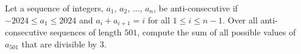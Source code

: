 Let a sequence of integers, $a_1$, $a_2$, ..., $a_n$, be anti-consecutive if $-2024 \le a_1  \le 2024$ and $a_i + a_{i+1} = i$ for all $1 \le i \le n - 1$. Over all anti-consecutive sequences of length $501$, compute the sum of all possible values of $a_{501}$ that are divisible by $3$.
